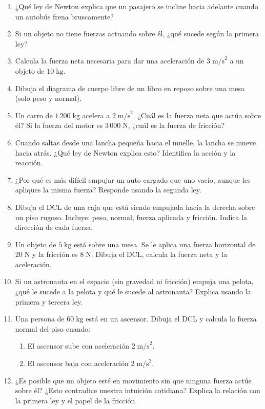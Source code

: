 \documentclass[12pt, a4paper]{article}
\begin{document}
\begin{enumerate}[leftmargin=*]
  \item \facil{} ¿Qué ley de Newton explica que un pasajero se incline hacia adelante cuando un autobús frena bruscamente?

  \item \facil{} Si un objeto no tiene fuerzas actuando sobre él, ¿qué sucede según la primera ley?

  \item \facil{} Calcula la fuerza neta necesaria para dar una aceleración de $3\;\text{m/s}^2$ a un objeto de $10\;\text{kg}$.

  \item \facil{} Dibuja el diagrama de cuerpo libre de un libro en reposo sobre una mesa (solo peso y normal).

  \item \medio{} Un carro de $1\,200\;\text{kg}$ acelera a $2\;\text{m/s}^2$. ¿Cuál es la fuerza neta que actúa sobre él? Si la fuerza del motor es $3\,000\;\text{N}$, ¿cuál es la fuerza de fricción?

  \item \medio{} Cuando saltas desde una lancha pequeña hacia el muelle, la lancha se mueve hacia atrás. ¿Qué ley de Newton explica esto? Identifica la acción y la reacción.

  \item \medio{} ¿Por qué es más difícil empujar un auto cargado que uno vacío, aunque les apliques la misma fuerza? Responde usando la segunda ley.

  \item \medio{} Dibuja el DCL de una caja que está siendo empujada hacia la derecha sobre un piso rugoso. Incluye: peso, normal, fuerza aplicada y fricción. Indica la dirección de cada fuerza.

  \item \dificil{} Un objeto de $5\;\text{kg}$ está sobre una mesa. Se le aplica una fuerza horizontal de $20\;\text{N}$ y la fricción es $8\;\text{N}$. Dibuja el DCL, calcula la fuerza neta y la aceleración.

  \item \dificil{} Si un astronauta en el espacio (sin gravedad ni fricción) empuja una pelota, ¿qué le sucede a la pelota y qué le sucede al astronauta? Explica usando la primera y tercera ley.

  \item \dificil{} Una persona de $60\;\text{kg}$ está en un ascensor. Dibuja el DCL y calcula la fuerza normal del piso cuando:
  \begin{enumerate}[label=\alph*)]
    \item El ascensor sube con aceleración $2\;\text{m/s}^2$.
    \item El ascensor baja con aceleración $2\;\text{m/s}^2$.
  \end{enumerate}

  \item \dificil{} ¿Es posible que un objeto esté en movimiento sin que ninguna fuerza actúe sobre él? ¿Esto contradice nuestra intuición cotidiana? Explica la relación con la primera ley y el papel de la fricción.
\end{enumerate}
\end{document}
